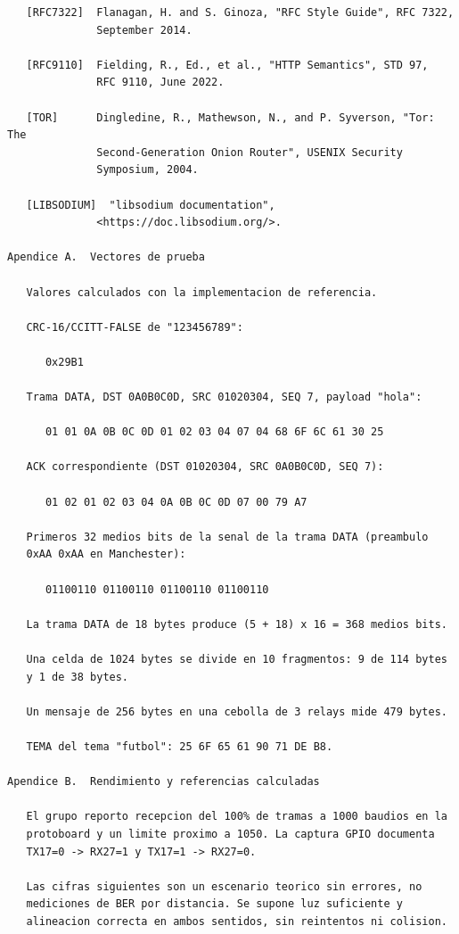 \begin{Verbatim}
   [RFC7322]  Flanagan, H. and S. Ginoza, "RFC Style Guide", RFC 7322,
              September 2014.

   [RFC9110]  Fielding, R., Ed., et al., "HTTP Semantics", STD 97,
              RFC 9110, June 2022.

   [TOR]      Dingledine, R., Mathewson, N., and P. Syverson, "Tor: The
              Second-Generation Onion Router", USENIX Security
              Symposium, 2004.

   [LIBSODIUM]  "libsodium documentation",
              <https://doc.libsodium.org/>.

Apendice A.  Vectores de prueba

   Valores calculados con la implementacion de referencia.

   CRC-16/CCITT-FALSE de "123456789":

      0x29B1

   Trama DATA, DST 0A0B0C0D, SRC 01020304, SEQ 7, payload "hola":

      01 01 0A 0B 0C 0D 01 02 03 04 07 04 68 6F 6C 61 30 25

   ACK correspondiente (DST 01020304, SRC 0A0B0C0D, SEQ 7):

      01 02 01 02 03 04 0A 0B 0C 0D 07 00 79 A7

   Primeros 32 medios bits de la senal de la trama DATA (preambulo
   0xAA 0xAA en Manchester):

      01100110 01100110 01100110 01100110

   La trama DATA de 18 bytes produce (5 + 18) x 16 = 368 medios bits.

   Una celda de 1024 bytes se divide en 10 fragmentos: 9 de 114 bytes
   y 1 de 38 bytes.

   Un mensaje de 256 bytes en una cebolla de 3 relays mide 479 bytes.

   TEMA del tema "futbol": 25 6F 65 61 90 71 DE B8.

Apendice B.  Rendimiento y referencias calculadas

   El grupo reporto recepcion del 100% de tramas a 1000 baudios en la
   protoboard y un limite proximo a 1050. La captura GPIO documenta
   TX17=0 -> RX27=1 y TX17=1 -> RX27=0.

   Las cifras siguientes son un escenario teorico sin errores, no
   mediciones de BER por distancia. Se supone luz suficiente y
   alineacion correcta en ambos sentidos, sin reintentos ni colision.
\end{Verbatim}
